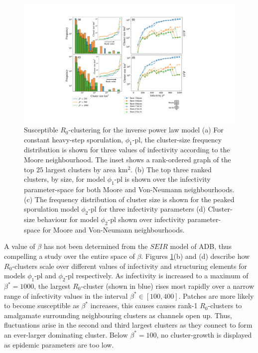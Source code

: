 \begin{figure}
    \centering
    \includegraphics[scale=0.45]{chapter6/figures/fig6-pl-cluster-distribution.pdf}
    \caption{Susceptible $R_0$-clustering for the inverse power law model (a) For constant heavy-step sporulation, $\phi_1$-pl, the cluster-size frequency distribution is shown for three values of infectivity according to the Moore neighbourhood. The inset shows a rank-ordered graph of the top $25$ largest clusters by area $\mathrm{km^2}$. (b) The top three ranked clusters, by size, for model $\phi_1$-pl is shown over the infectivity parameter-space for both Moore and Von-Neumann neighbourhoods. (c) The frequency distribution of cluster size is shown for the peaked sporulation model $\phi_2$-pl for three infectivity parameters (d) Cluster-size behaviour for model $\phi_2$-pl shown over infectivity parameter-space for Moore and Von-Neumann neighbourhoods.}
    \label{fig:inverse-power-law-clustering}
\end{figure}

A value of $\beta$ has not been determined from the $SEIR$ model of ADB, thus compelling a study over the entire space of $\beta$.
Figures \ref{fig:inverse-power-law-clustering}(b) and (d) describe how $R_0$-clusters scale over different values of infectivity and structuring elements for models $\phi_1$-pl and $\phi_2$-pl respectively.
As infectivity is increased to a maximum of $\beta^*=1000$, the largest $R_0$-cluster (shown in blue) rises most rapidly over a narrow range of infectivity values in the interval $\beta^*\in [100, 400]$.
Patches are more likely to become susceptible as $\beta^*$ increases, this causes causes rank-1 $R_0$-clusters to amalgamate surrounding neighbouring clusters as channels open up.
Thus, fluctuations arise in the second and third largest clusters as they connect to form an ever-larger dominating cluster.
Below $\beta^*=100$, no cluster-growth is displayed as epidemic parameters are too low. 
 
